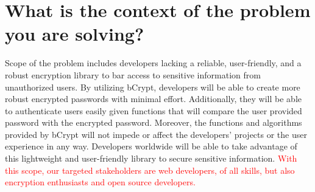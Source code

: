 \documentclass[12pt]{article}
\begin{document}
\section{What is the context of the problem you are solving?}

  Scope of the problem includes developers lacking a reliable, user-friendly, and a robust encryption library to bar access to sensitive information from unauthorized users. By utilizing bCrypt, developers will be able to create more robust encrypted passwords with minimal effort. Additionally, they will be able to authenticate users easily given functions that will compare the user provided password with the encrypted password. Moreover, the functions and algorithms provided by bCrypt will not impede or affect the developers’ projects or the user experience in any way. Developers worldwide will be able to take advantage of this lightweight and user-friendly library to secure sensitive information. \textcolor{red}{With this scope, our targeted stakeholders are web developers, of all skills, but also encryption enthusiasts and open source developers.}
\end{document}
